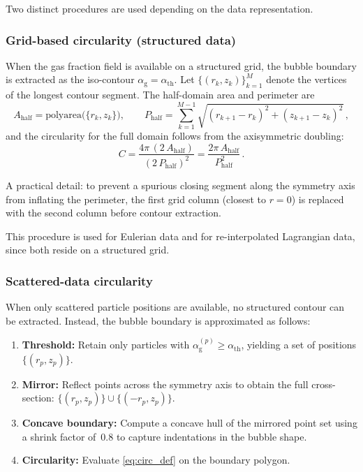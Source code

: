 \documentclass[11pt,a4paper]{article}
\newcommand{\alphag}{\alpha_{\mathrm{g}}}
\begin{document}
Two distinct procedures are used depending on the data representation.

\subsubsection{Grid-based circularity (structured data)}
\label{sec:circ_grid}

When the gas fraction field is available on a structured grid, the bubble
boundary is extracted as the iso-contour $\alphag = \alpha_{\mathrm{th}}$.
Let $\{(r_k, z_k)\}_{k=1}^{M}$ denote the vertices of the longest contour
segment.  The half-domain area and perimeter are
\begin{equation}\label{eq:circ_grid_AP}
  A_{\mathrm{half}} = \mathrm{polyarea}\bigl(\{r_k, z_k\}\bigr),
  \qquad
  P_{\mathrm{half}} = \sum_{k=1}^{M-1}
    \sqrt{(r_{k+1}-r_k)^2 + (z_{k+1}-z_k)^2}\,,
\end{equation}
and the circularity for the full domain follows from the axisymmetric
doubling:
\begin{equation}\label{eq:circ_grid}
  C = \frac{4\pi\,(2\,A_{\mathrm{half}})}{(2\,P_{\mathrm{half}})^2}
    = \frac{2\pi\,A_{\mathrm{half}}}{P_{\mathrm{half}}^2}\,.
\end{equation}

A practical detail: to prevent a spurious closing segment along the symmetry
axis from inflating the perimeter, the first grid column (closest to
$r = 0$) is replaced with the second column before contour extraction.

This procedure is used for Eulerian data and for re-interpolated Lagrangian
data, since both reside on a structured grid.


\subsubsection{Scattered-data circularity}
\label{sec:circ_scattered}

When only scattered particle positions are available, no structured contour
can be extracted.  Instead, the bubble boundary is approximated as follows:
\begin{enumerate}
  \item \textbf{Threshold:} Retain only particles with
    $\alphag^{(p)} \geq \alpha_{\mathrm{th}}$, yielding a set of positions
    $\{(r_p, z_p)\}$.
  \item \textbf{Mirror:} Reflect points across the symmetry axis to obtain
    the full cross-section: $\{(r_p, z_p)\} \cup \{(-r_p, z_p)\}$.
  \item \textbf{Concave boundary:} Compute a concave hull of the mirrored
    point set using a shrink factor of~$0.8$ to capture indentations in the
    bubble shape.
  \item \textbf{Circularity:} Evaluate \cref{eq:circ_def} on the boundary
    polygon.
\end{enumerate}
\end{document}
